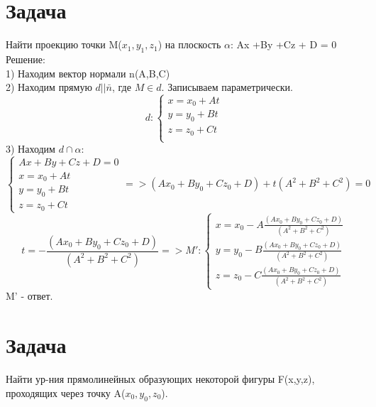\documentclass[a4paper,14pt]{extreport} %
\begin{document}
\section*{Задача}
Найти проекцию точки M(\begin{math}
  x_1, y_1,z_1
\end{math}) на плоскость $\alpha$: Ax +By +Cz + D = 0 
Решение:\\
1) Находим вектор нормали n(A,B,C) \\
2) Находим прямую $ d || \bar{n}$, где $ M \in d$. Записываем параметрически.
\begin{equation}d:
\begin{cases}
  x = x_0 + At\\
  y = y_0 + Bt\\
  z = z_0 + Ct\\
\end{cases}
\end{equation}
3) Находим $ d \cap \alpha $: \\ 
\[
  \begin{cases}
    Ax +By +Cz + D = 0 \\
  x = x_0 + At\\
  y = y_0 + Bt\\
  z = z_0 + Ct
\end{cases} => (Ax_0 + By_0 + Cz_0 + D) + t(A^2 + B^2 + C^2) = 0 
\]
\[
  t =-\frac{(Ax_0 + By_0 + Cz_0 + D)}{(A^2 + B^2 + C^2)} => M':
  \begin{cases}
    
  x = x_0 - A\frac{(Ax_0 + By_0 + Cz_0 + D)}{(A^2 + B^2 + C^2)} \\
  y = y_0 - B\frac{(Ax_0 + By_0 + Cz_0 + D)}{(A^2 + B^2 + C^2)}\\
  z = z_0 - C\frac{(Ax_0 + By_0 + Cz_0 + D)}{(A^2 + B^2 + C^2)}
  \end{cases}
\]
M' - ответ. 

\section*{Задача}
Найти ур-ния прямолинейных образующих некоторой фигуры F(x,y,z), проходящих через точку A($x_0,y_0,z_0$).\\
\end{document}
